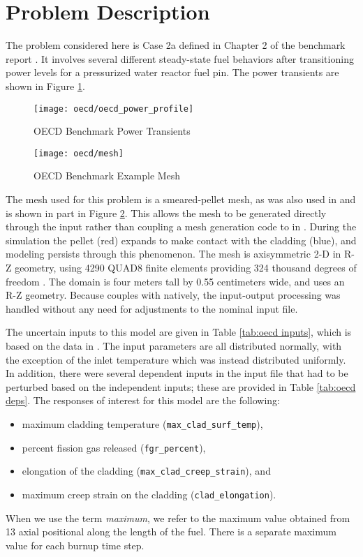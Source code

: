 \section{Problem Description}
The problem considered here is Case 2a defined in Chapter 2 of the benchmark report \cite{OECDbenchmark}.  It
involves several different steady-state fuel behaviors after transitioning power levels for a pressurized
water reactor fuel pin.  The power transients are shown in Figure \ref{fig:oecd powershape}.
\begin{figure}[htb]
  \centering
  \texttt{[image: oecd/oecd\_power\_profile]}
  \caption{OECD Benchmark Power Transients}
  \label{fig:oecd powershape}
\end{figure}
\begin{figure}[htb]
  \centering
  \texttt{[image: oecd/mesh]}
  \caption{OECD Benchmark Example Mesh}
  \label{fig:oecd mesh}
\end{figure}

The \bison{} mesh used for this problem is a smeared-pellet mesh, as was also used in
\cite{OECDdakota} and is shown in part in Figure \ref{fig:oecd mesh}.  This allows the mesh to be generated 
directly through the \bison{} input rather than
coupling a mesh generation code to \bison{} in \raven{}.
During the simulation the pellet (red) expands to make
contact with the cladding (blue), and modeling persists through this phenomenon.  The mesh is axisymmetric
2-D in R-Z geometry, using 4290 QUAD8 finite elements providing 324 thousand degrees of freedom \cite{OECDdakota}.
The domain is four meters tall by 0.55 centimeters wide, and uses an R-Z geometry.  
Because \raven{} couples with \bison{} natively, the input-output processing was handled without any need for
adjustments to the nominal input file.

The uncertain inputs to this model are given in Table \ref{tab:oecd inputs}, which is based on the data in
\cite{OECDdakota}.  The input parameters are all distributed normally, with the exception of the inlet
temperature which was instead distributed uniformly.  In addition, there were several dependent inputs in the \bison{}
input file that had to be perturbed based on the independent inputs; these are provided in Table \ref{tab:oecd deps}.
The responses of interest for this model are the following:
\begin{itemize}
  \item maximum cladding temperature (\texttt{max\_clad\_surf\_temp}),
  \item percent fission gas released (\texttt{fgr\_percent}), 
  \item elongation of the cladding (\texttt{max\_clad\_creep\_strain}), and
  \item maximum creep strain on the cladding (\texttt{clad\_elongation}).
\end{itemize}
When we use the term \emph{maximum}, we refer to the maximum value obtained from 13 axial positional along the
length of the fuel.  There is a separate maximum value for each burnup time step.

